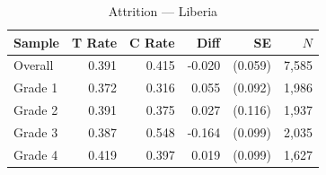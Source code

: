 \begin{table}[htbp]
\centering
\small
\caption{Attrition --- Liberia}
\label{tab:lib_attrition}
\begin{tabular}{l*{5}{r}}
\toprule
Sample & T Rate & C Rate & Diff & SE & $N$ \\
\midrule
Overall & 0.391 & 0.415 & -0.020 & (0.059) & 7,585 \\
\addlinespace
Grade 1 & 0.372 & 0.316 & 0.055 & (0.092) & 1,986 \\
Grade 2 & 0.391 & 0.375 & 0.027 & (0.116) & 1,937 \\
Grade 3 & 0.387 & 0.548 & -0.164 & (0.099) & 2,035 \\
Grade 4 & 0.419 & 0.397 & 0.019 & (0.099) & 1,627 \\
\bottomrule
\end{tabular}
\end{table}